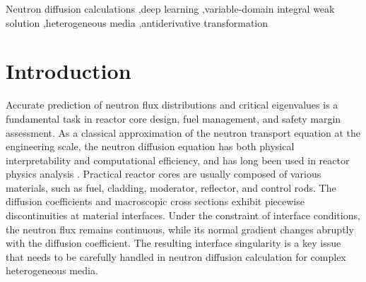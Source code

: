 \documentclass[final,3p,times,sort&compress]{elsarticle}
\begin{document}
\begin{frontmatter}



    \begin{keyword}
        Neutron diffusion calculations \sep deep learning \sep variable-domain integral weak solution \sep heterogeneous media \sep antiderivative transformation




    \end{keyword}

\end{frontmatter}


\section{Introduction} 
\label{sec:introduction}

Accurate prediction of neutron flux distributions and critical eigenvalues is a fundamental task in reactor core design, fuel management, and safety margin assessment. As a classical approximation of the neutron transport equation at the engineering scale, the neutron diffusion equation has both physical interpretability and computational efficiency, and has long been used in reactor physics analysis \cite{xie2020nuclear}. Practical reactor cores are usually composed of various materials, such as fuel, cladding, moderator, reflector, and control rods. The diffusion coefficients and macroscopic cross sections exhibit piecewise discontinuities at material interfaces. Under the constraint of interface conditions, the neutron flux remains continuous, while its normal gradient changes abruptly with the diffusion coefficient. The resulting interface singularity is a key issue that needs to be carefully handled in neutron diffusion calculation for complex heterogeneous media.
\end{document}
